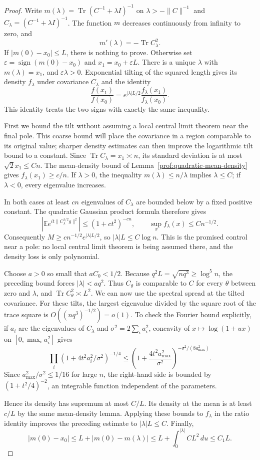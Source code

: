 \begin{proof}
Write $m(\lambda)=\operatorname{Tr}(C^{-1}+\lambda I)^{-1}$ on
$\lambda>-\|C\|^{-1}$ and $C_\lambda=(C^{-1}+\lambda I)^{-1}$.
The function $m$ decreases continuously from infinity to zero, and
\[
 m'(\lambda)=-\operatorname{Tr}C_\lambda^2.
\]
If $|m(0)-x_0|\le L$, there is nothing to prove. Otherwise set
$\varepsilon=\operatorname{sign}(m(0)-x_0)$ and
$x_1=x_0+\varepsilon L$. There is a unique $\lambda$ with
$m(\lambda)=x_1$, and $\varepsilon\lambda>0$.
Exponential tilting of the squared length gives its density $f_\lambda$
under covariance $C_\lambda$ and the identity
\[
 \frac{f(x_1)}{f(x_0)}
 =e^{|\lambda|L/2}\frac{f_\lambda(x_1)}{f_\lambda(x_0)}.
\]
This identity treats the two signs with exactly the same inequality.

First we bound the tilt without assuming a local central limit theorem
near the final pole. This coarse bound will place the covariance in a
region comparable to its original value; sharper density estimates can
then improve the logarithmic tilt bound to a constant. Since
$\operatorname{Tr}C_\lambda=x_1\asymp n$, its standard deviation is
at most $\sqrt2x_1\le Cn$. The mean-density bound of
Lemma~\ref{prof:quadratic-mean-density} gives
$f_\lambda(x_1)\ge c/n$.
If $\lambda>0$, the inequality $m(\lambda)\le n/\lambda$ implies
$\lambda\le C$; if $\lambda<0$, every eigenvalue increases.

In both cases at least $c n$ eigenvalues of $C_\lambda$ are bounded
below by a fixed positive constant. The quadratic Gaussian product
formula therefore gives
\[
 |\mathbb E e^{it\|C_\lambda^{1/2}g\|^2}|
 \le (1+c t^2)^{-cn},
 \qquad \sup_x f_\lambda(x)\le Cn^{-1/2}.
\]
Consequently
$M\ge c n^{-1/2}e^{|\lambda|L/2}$, so
$|\lambda|L\le C\log n$.
This is the promised control near a pole: no local central limit theorem
is being assumed there, and the density loss is only polynomial.

Choose $a>0$ so small that $aC_0<1/2$. Because
$q^2L=\sqrt{nq^3}\ge\log^5 n$, the preceding bound forces
$|\lambda|<a q^2$. Thus $C_\theta$ is comparable to $C$ for every
$\theta$ between zero and $\lambda$, and
$\operatorname{Tr}C_\theta^2\asymp L^2$.
We can now use the spectral spread at the tilted covariance. For these
tilts, the largest eigenvalue divided by the square root of
the trace square is $O((nq^3)^{-1/2})=o(1)$.
To check the Fourier bound explicitly, if $a_i$ are the eigenvalues of
$C_\lambda$ and $\sigma^2=2\sum_i a_i^2$, concavity of
$x\mapsto\log(1+ux)$ on $[0,\max_i a_i^2]$ gives
\[
 \prod_i(1+4t^2a_i^2/\sigma^2)^{-1/4}
 \le\left(1+\frac{4t^2a_{\max}^2}{\sigma^2}\right)
       ^{-\sigma^2/(8a_{\max}^2)}.
\]
Since $a_{\max}^2/\sigma^2\le1/16$ for large $n$, the right-hand side is
bounded by $(1+t^2/4)^{-2}$, an integrable function independent of the
parameters.

Hence its density has supremum at
most $C/L$. Its density at the mean is at least $c/L$ by the same
mean-density lemma. Applying these bounds to $f_\lambda$ in the ratio
identity improves the preceding estimate to $|\lambda|L\le C$.
Finally,
\[
 |m(0)-x_0|
 \le L+|m(0)-m(\lambda)|
 \le L+\int_0^{|\lambda|}C L^2\,du\le C_1L.
\]
\end{proof}
